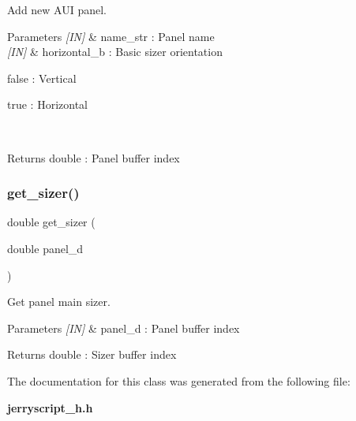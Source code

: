 Add new A\+UI panel. 


\begin{DoxyCode}{0}
\end{DoxyCode}



\begin{DoxyParams}{Parameters}
{\em \mbox{[}\+I\+N\mbox{]}} & name\+\_\+str \+: Panel name \\
\hline
{\em \mbox{[}\+I\+N\mbox{]}} & horizontal\+\_\+b \+: Basic sizer orientation \begin{DoxyItemize}
\item false \+: Vertical \item true \+: Horizontal \end{DoxyItemize}
\\
\hline
\end{DoxyParams}
\begin{DoxyReturn}{Returns}
double \+: Panel buffer index 
\end{DoxyReturn}
\mbox{\label{classpanel_a3d192aeb663e089278a27eec28435d0c}} 
\subsubsection{get\_sizer()}
{\footnotesize\ttfamily double get\+\_\+sizer (\begin{DoxyParamCaption}\item[{double}]{panel\+\_\+d }\end{DoxyParamCaption})}



Get panel main sizer. 


\begin{DoxyCode}{0}
\end{DoxyCode}



\begin{DoxyParams}{Parameters}
{\em \mbox{[}\+I\+N\mbox{]}} & panel\+\_\+d \+: Panel buffer index \\
\hline
\end{DoxyParams}
\begin{DoxyReturn}{Returns}
double \+: Sizer buffer index 
\end{DoxyReturn}


The documentation for this class was generated from the following file\+:\begin{DoxyCompactItemize}
\item 
\textbf{ jerryscript\+\_\+h.\+h}\end{DoxyCompactItemize}
